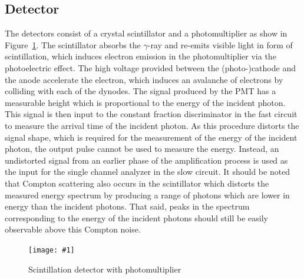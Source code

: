 \documentclass[twocolumn]{article}
\newcommand{\insertFigure}[1]{%
   \texttt{[image: \#1]}%
}
\begin{document}
\subsection{Detector}
The detectors consist of a crystal scintillator and a photomultiplier as show in Figure~\ref{fig:pmt}. The scintillator absorbs the $\gamma$-ray and re-emits visible light in form of scintillation, which induces electron emission in the photomultiplier via the photoelectric effect. The high voltage provided between the (photo-)cathode and the anode accelerate the electron, which induces an avalanche of electrons by colliding with each of the dynodes. The signal produced by the PMT has a measurable height which is proportional to the energy of the incident photon. This signal is then input to the constant fraction discriminator in the fast circuit to measure the arrival time of the incident photon. As this procedure distorts the signal shape, which is required for the measurement of the energy of the incident photon, the output pulse cannot be used to measure the energy. Instead, an undistorted signal from an earlier phase of the amplification process is used as the input for the single channel analyzer in the slow circuit. It should be noted that Compton scattering also occurs in the scintillator which distorts the measured energy spectrum by producing a range of photons which are lower in energy than the incident photons. That said, peaks in the spectrum corresponding to the energy of the incident photons should still be easily observable above this Compton noise.
\begin{figure}[!h]
\centering
\insertFigure{pmt.png} %
\caption{Scintillation detector with photomultiplier \cite{pmt}} 
\label{fig:pmt}
\end{figure}
\end{document}
